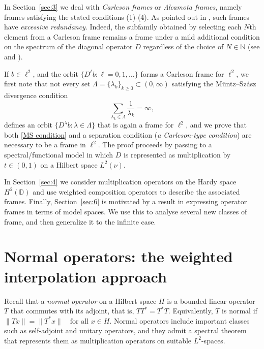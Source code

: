 \documentclass[11pt]{amsart}
\theoremstyle{definition}
\theoremstyle{remark}
\numberwithin{equation}{section}
\def\DD{{\mathbb D}}
\begin{document}
\smallskip

In Section~\ref{sec:3} we deal with \emph{Carleson frames} or \emph{Alcamota frames}, namely frames satisfying the stated conditions (1)-(4).  As pointed out in \cite{ACKM25}, such frames have \emph{excessive redundancy}.
Indeed, the subfamily obtained by selecting each $N$th element from a
Carleson frame remains a frame under a mild additional condition on the spectrum of the diagonal operator $D$ regardless of the choice of $N \in \mathbb{N}$ (see \cite{ChristensenHasannasabPhilippStoeva2024} and \cite{KrishtalMiller2026}). {If $b\in\ell^{2}$, and the orbit $\{D^{\ell}b:\ell=0,1,\dots\}$ forms a Carleson frame for $\ell^{2}$, we first note that not every set $\Lambda=\{\lambda_k\}_{k\geq 0}\subset(0,\infty)$ satisfying the Müntz--Szász divergence condition
\begin{equation}\label{MS condition}
\sum_{\lambda_k\in\Lambda}\frac{1}{\lambda_k}=\infty,
\end{equation}
defines an orbit $\{D^{\lambda}b:\lambda\in\Lambda\}$ that is again a frame for $\ell^{2}$, and we prove that both  \eqref{MS condition} and a separation condition (\emph{a Carleson-type condition}) are necessary to be a frame in $\ell^{2}$. The proof proceeds by passing to a spectral/functional model in which $D$ is represented as multiplication by $t\in(0,1)$ on a Hilbert space $L^2(\nu)$.

\smallskip

In Section~\ref{sec:4} we consider multiplication operators on the Hardy space $H^2(\DD)$ and use weighted composition operators to describe the associated frames.
Finally, Section~\ref{sec:6} is motivated by a result in \cite{CHP20} expressing operator frames in terms of model spaces. We use this to analyse several new classes of frame, and then generalize it to the infinite case.

\section {Normal operators: the weighted interpolation approach} \label{sec:2}

Recall that a \emph{normal operator} on a Hilbert space $H$ is a bounded linear operator $T$ that commutes with its adjoint, that is,
$T T^* = T^* T.$ Equivalently, $T$ is normal if
$\|Tx\| = \|T^*x\| \quad \text{for all } x \in H$. Normal operators include important classes such as self-adjoint and unitary operators,
and they admit a spectral theorem that represents them as multiplication operators on suitable $L^2$-spaces.

}
\end{document}
